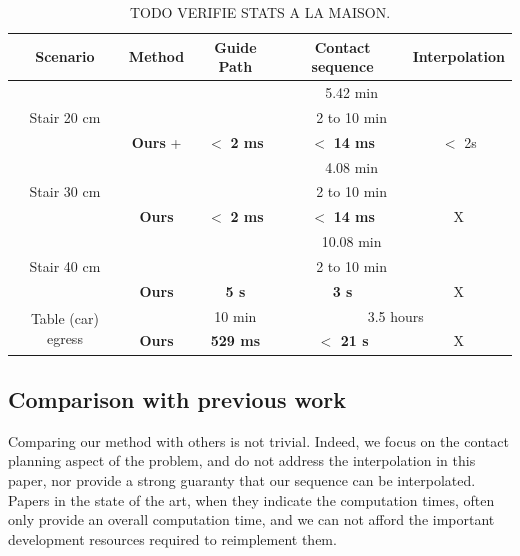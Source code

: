 \begin{table}
\centering
\begin{tabular}{ c | c | c | c | c }
 Scenario & Method  & Guide Path & Contact sequence & Interpolation \\
 \hline
   \multirow{3}{*}{Stair 20 cm} & \citeauthor{Hauser06usingmotion} &  \multicolumn{3}{c}{5.42 min}  \\
							 & \citeauthor{Mordatch:2012:DCB:2185520.2185539} &  \multicolumn{3}{c}{2 to 10 min} \\
							 & \textbf{Ours} + \citeauthor{Carpentier2016}  & $\mathbf{<}$ \textbf{2 ms} & $\mathbf{<}$ \textbf{14 ms} & $ <$ 2s \\
 \hline
   \multirow{3}{*}{Stair 30 cm} & \citeauthor{Hauser06usingmotion} &  \multicolumn{3}{c}{4.08 min}  \\
							 & \citeauthor{Mordatch:2012:DCB:2185520.2185539} &  \multicolumn{3}{c}{2 to 10 min} \\
							 & \textbf{Ours}  & $\mathbf{<}$ \textbf{2 ms} & $\mathbf{<}$ \textbf{14 ms} & X \\
 \hline
   \multirow{3}{*}{Stair 40 cm} & \citeauthor{Hauser06usingmotion} &  \multicolumn{3}{c}{10.08 min}  \\
							 & \citeauthor{Mordatch:2012:DCB:2185520.2185539} &  \multicolumn{3}{c}{2 to 10 min} \\
							 & \textbf{Ours}  & \textbf{5 s} & \textbf{3 s} & X \\
 \hline
   \multirow{2}{*}{Table (car) egress} & \citeauthor{Bouyarmane2009, DBLP:conf/iser/EscandeKMG08} & 10 min & \multicolumn{2}{c}{3.5 hours}  \\
							 & \textbf{Ours}  & \textbf{529 ms} & \textbf{$<$ 21 s} & X \\
 \end{tabular}
\caption{TODO VERIFIE STATS A LA MAISON.}
\label{tab:compprev}
\quad
\end{table}
\subsection{Comparison with previous work} \label{sec:compa}
Comparing our method with others is not trivial. Indeed, we focus on the contact planning aspect of the problem, and do not address
the interpolation in this paper, nor provide a strong guaranty that our sequence can be interpolated.
Papers in the state of the art, when they indicate the computation times, often only provide an overall computation
time, and we can not afford the important development resources required to reimplement them.

